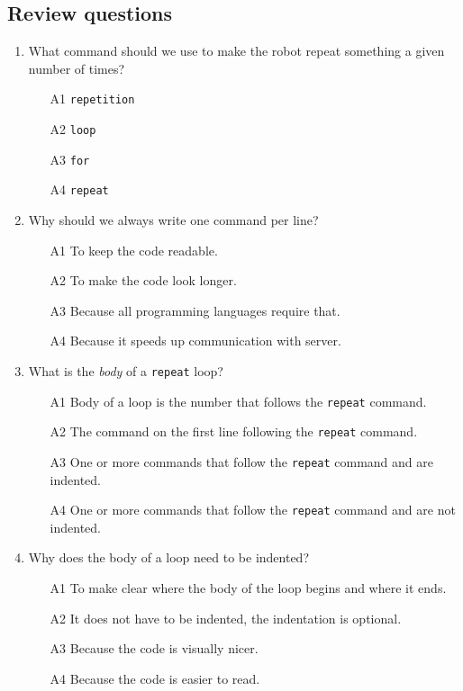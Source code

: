 {{\subsection{Review questions} 

\begin{enumerate}
\item What command should we use to make the robot repeat something a given number of times?
\begin{enumerate}
\item[A1] {\tt repetition}
\item[A2] {\tt loop}
\item[A3] {\tt for}
\item[A4] {\tt repeat}
\end{enumerate}
\item Why should we always write one command per line?
\begin{enumerate}
\item[A1] To keep the code readable.
\item[A2] To make the code look longer.
\item[A3] Because all programming languages require that.
\item[A4] Because it speeds up communication with server.
\end{enumerate}
\item What is the {\em body} of a {\tt repeat} loop?
\begin{enumerate}
\item[A1] Body of a loop is the number that follows the {\tt repeat} command. 
\item[A2] The command on the first line following the {\tt repeat} command.
\item[A3] One or more commands that follow the {\tt repeat} command and are indented.
\item[A4] One or more commands that follow the {\tt repeat} command and are not indented.
\end{enumerate}
\item Why does the body of a loop need to be indented?
\begin{enumerate}
\item[A1] To make clear where the body of the loop begins and where it ends.
\item[A2] It does not have to be indented, the indentation is optional.
\item[A3] Because the code is visually nicer.
\item[A4] Because the code is easier to read.

\end{enumerate}
\end{enumerate}}}
